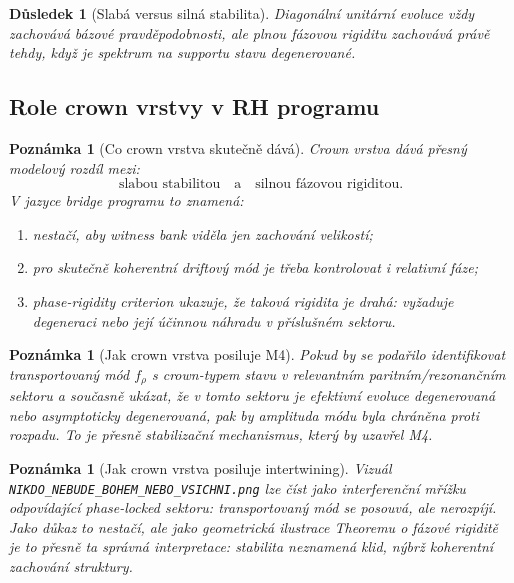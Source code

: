 \documentclass[11pt,a4paper]{article}
\newtheorem{corollary}[theorem]{Důsledek}
\newtheorem{remark}[theorem]{Poznámka}
\begin{document}
\begin{corollary}[Slabá versus silná stabilita]
Diagonální unitární evoluce vždy zachovává bázové pravděpodobnosti, ale plnou fázovou rigiditu zachovává
právě tehdy, když je spektrum na supportu stavu degenerované.
\end{corollary}

\subsection*{Role crown vrstvy v RH programu}

\begin{remark}[Co crown vrstva skutečně dává]
Crown vrstva dává přesný modelový rozdíl mezi:
\[
\text{slabou stabilitou} \quad\text{a}\quad \text{silnou fázovou rigiditou}.
\]
V jazyce bridge programu to znamená:
\begin{enumerate}
    \item nestačí, aby witness bank viděla jen zachování velikostí;
    \item pro skutečně koherentní driftový mód je třeba kontrolovat i relativní fáze;
    \item phase-rigidity criterion ukazuje, že taková rigidita je drahá: vyžaduje degeneraci nebo její účinnou náhradu v příslušném sektoru.
\end{enumerate}
\end{remark}

\begin{remark}[Jak crown vrstva posiluje M4]
Pokud by se podařilo identifikovat transportovaný mód \(f_\rho\) s crown-typem stavu v relevantním
paritním/rezonančním sektoru a současně ukázat, že v tomto sektoru je efektivní evoluce degenerovaná
nebo asymptoticky degenerovaná, pak by amplituda módu byla chráněna proti rozpadu.
To je přesně stabilizační mechanismus, který by uzavřel M4.
\end{remark}

\begin{remark}[Jak crown vrstva posiluje intertwining]
Vizuál \texttt{NIKDO\_NEBUDE\_BOHEM\_NEBO\_VSICHNI.png} lze číst jako interferenční mřížku
odpovídající phase-locked sektoru: transportovaný mód se posouvá, ale nerozpíjí.
Jako důkaz to nestačí, ale jako geometrická ilustrace Theoremu o fázové rigiditě je to přesně
ta správná interpretace: stabilita neznamená klid, nýbrž koherentní zachování struktury.
\end{remark}
\end{document}
